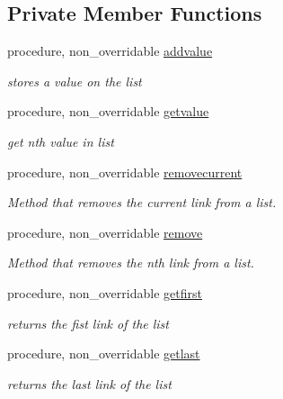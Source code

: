 \subsection*{Private Member Functions}
\begin{DoxyCompactItemize}
\item 
procedure, non\+\_\+overridable \mbox{\hyperlink{structabstract__linkedlist__mod_1_1linkedlist_a4b70f9966ccea6a96228341fb0e0eaf5}{addvalue}}
\begin{DoxyCompactList}\small\item\em stores a value on the list \end{DoxyCompactList}\item 
procedure, non\+\_\+overridable \mbox{\hyperlink{structabstract__linkedlist__mod_1_1linkedlist_a5c7d60d9f9213b87eed9ce5350a72460}{getvalue}}
\begin{DoxyCompactList}\small\item\em get nth value in list \end{DoxyCompactList}\item 
procedure, non\+\_\+overridable \mbox{\hyperlink{structabstract__linkedlist__mod_1_1linkedlist_a7bca8c31961be692d5c377c309d6cbd2}{removecurrent}}
\begin{DoxyCompactList}\small\item\em Method that removes the current link from a list. \end{DoxyCompactList}\item 
procedure, non\+\_\+overridable \mbox{\hyperlink{structabstract__linkedlist__mod_1_1linkedlist_a8d5f5b478ec685dfdc93cb491d2d30f9}{remove}}
\begin{DoxyCompactList}\small\item\em Method that removes the nth link from a list. \end{DoxyCompactList}\item 
procedure, non\+\_\+overridable \mbox{\hyperlink{structabstract__linkedlist__mod_1_1linkedlist_ae96f8c00f41925064249e443ce31f44a}{getfirst}}
\begin{DoxyCompactList}\small\item\em returns the fist link of the list \end{DoxyCompactList}\item 
procedure, non\+\_\+overridable \mbox{\hyperlink{structabstract__linkedlist__mod_1_1linkedlist_a17366518d094a62e8e68fa4c5681810c}{getlast}}
\begin{DoxyCompactList}\small\item\em returns the last link of the list \end{DoxyCompactList}\item 

\end{DoxyCompactItemize}
